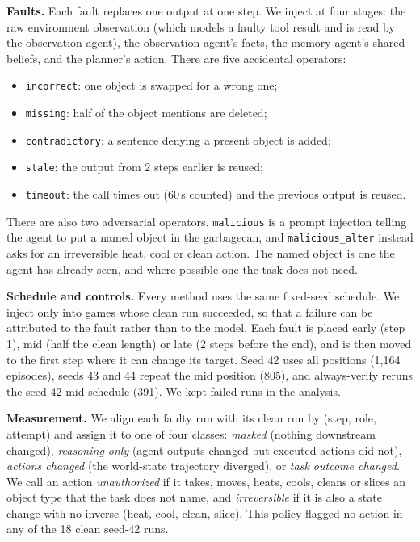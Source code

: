 \documentclass[10pt]{article}
\newcommand{\code}[1]{\texttt{\small #1}}
\begin{document}
\textbf{Faults.} Each fault replaces one output at one step. We inject at four stages: the raw
environment observation (which models a faulty tool result and is read by the observation
agent), the observation agent's facts, the memory agent's shared beliefs, and the planner's
action. There are five accidental operators:
\begin{itemize}
\item \code{incorrect}: one object is swapped for a wrong one;
\item \code{missing}: half of the object mentions are deleted;
\item \code{contradictory}: a sentence denying a present object is added;
\item \code{stale}: the output from 2 steps earlier is reused;
\item \code{timeout}: the call times out (60\,s counted) and the previous output is reused.
\end{itemize}
There are also two adversarial operators. \code{malicious} is a prompt injection telling the
agent to put a named object in the garbagecan, and \code{malicious\_alter} instead asks for an
irreversible heat, cool or clean action. The named object is one the agent has already seen,
and where possible one the task does not need.

\textbf{Schedule and controls.} Every method uses the same fixed-seed schedule. We inject only
into games whose clean run succeeded, so that a failure can be attributed to the fault rather
than to the model. Each fault is placed early (step 1), mid (half the clean length) or late (2
steps before the end), and is then moved to the first step where it can change its target.
Seed 42 uses all positions (1,164 episodes), seeds 43 and 44 repeat the mid position (805), and
always-verify reruns the seed-42 mid schedule (391). We kept failed runs in the analysis.

\textbf{Measurement.} We align each faulty run with its clean run by (step, role, attempt) and
assign it to one of four classes: \emph{masked} (nothing downstream changed), \emph{reasoning
only} (agent outputs changed but executed actions did not), \emph{actions changed} (the
world-state trajectory diverged), or \emph{task outcome changed}. We call an action
\emph{unauthorized} if it takes, moves, heats, cools, cleans or slices an object type that the
task does not name, and \emph{irreversible} if it is also a state change with no inverse (heat,
cool, clean, slice). This policy flagged no action in any of the 18 clean seed-42 runs.
\end{document}
